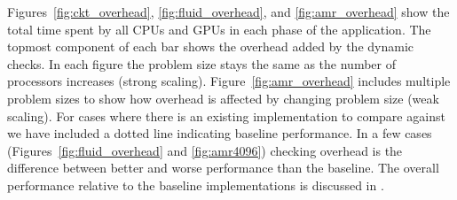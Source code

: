 Figures~\ref{fig:ckt_overhead}, \ref{fig:fluid_overhead}, and \ref{fig:amr_overhead} show 
the total time spent by all CPUs and GPUs in each phase of the application.  The topmost
component of each bar shows the overhead added by the dynamic checks.  In 
each figure the problem size stays the same as the number of processors increases
(strong scaling).  Figure~\ref{fig:amr_overhead} includes multiple problem sizes to show
how overhead is affected by changing problem size (weak scaling).  For cases where there
is an existing implementation to compare against we have included a dotted line indicating
baseline performance.  In a few cases (Figures~\ref{fig:fluid_overhead} and 
\ref{fig:amr4096}) checking overhead is the difference
between better and worse performance than the baseline.  The overall
performance relative to the baseline implementations is discussed in \cite{Legion12}.

